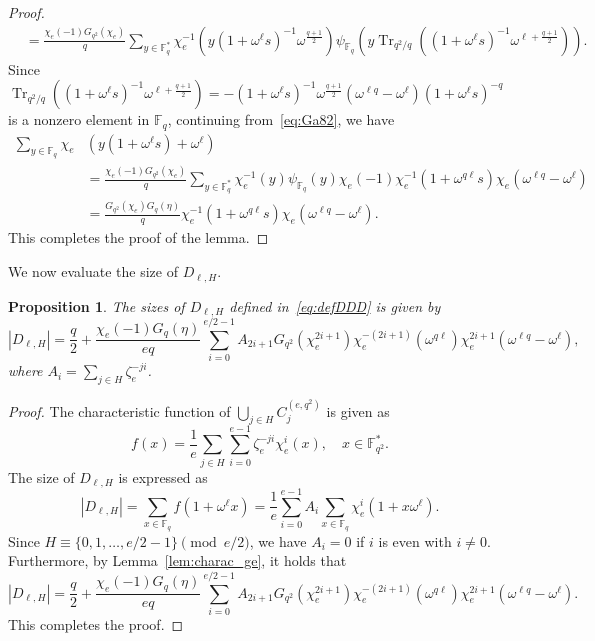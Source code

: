 \documentclass[10pt]{amsart}
\newtheorem{prop}[theo]{Proposition}
\theoremstyle{definition}
\DeclareMathOperator{\Tr}{Tr}
\newcommand*\F{{\mathbb F}}
\begin{document}
\begin{proof}
\begin{align}
&=\frac{\chi_e(-1)G_{q^2}(\chi_e)}{q}\sum_{y\in \F_q^\ast}\chi_e^{-1}(y (1+\omega^\ell s)^{-1}\omega^\frac{q+1}{2})\psi_{\F_q}(y\Tr_{q^2/q}((1+\omega^\ell s)^{-1}\omega^{\ell+\frac{q+1}{2}})). \label{eq:Ga82}
\end{align}
Since $\Tr_{q^2/q}((1+\omega^\ell s)^{-1}\omega^{\ell+\frac{q+1}{2}})=-(1+\omega^\ell s)^{-1}\omega^\frac{q+1}{2}(\omega^{\ell q}-\omega^\ell)(1+\omega^\ell s)^{-q}$ is a nonzero element in $\F_q$, continuing from~\eqref{eq:Ga82}, we have
\begin{align*}
\sum_{y\in \F_q}\chi_e&(y(1+\omega^\ell s)+\omega^\ell)\\
&=\frac{\chi_e(-1)G_{q^2}(\chi_e)}{q}\sum_{y\in \F_q^\ast}\chi_e^{-1}(y)\psi_{\F_q}(y)\chi_e(-1)\chi_e^{-1}(1+\omega^{q\ell}s)
\chi_e(\omega^{\ell q}-\omega^\ell)\\
&=\frac{G_{q^2}(\chi_e)G_q(\eta)}{q}\chi_e^{-1}(1+\omega^{q\ell}s)
\chi_e(\omega^{\ell q}-\omega^\ell).
\end{align*}
This completes the proof of the lemma.
\end{proof}

We now evaluate the size of $D_{\ell,H}$.

\begin{prop}\label{prop:sizeHH}
The sizes of $D_{\ell,H}$ defined in~\eqref{eq:defDDD} is given by
\begin{equation}\label{eq:sizeH}
|D_{\ell,H}|=\frac{q}{2}+\frac{\chi_e(-1)G_q(\eta)}{eq}\sum_{i=0}^{e/2-1} A_{2i+1} G_{q^2}(\chi_e^{2i+1})\chi_e^{-(2i+1)}(\omega^{q\ell})\chi_e^{2i+1}(\omega^{\ell q}-\omega^{\ell}),
\end{equation}
where $A_i=\sum_{j\in H}\zeta_e^{-ji}$.
\end{prop}

\begin{proof}
The characteristic function of $\bigcup_{j \in H}C_{j}^{(e,q^2)}$ is given as
\begin{equation}\label{eq:deff}
f(x)=\frac{1}{e}\sum_{j\in H}\sum_{i=0}^{e-1}\zeta_e^{-ji}\chi_e^i(x), \quad x\in \F_{q^2}^\ast.
\end{equation}
The size of $D_{\ell,H}$ is expressed as
\[
|D_{\ell,H}|=\sum_{x\in \F_q}f(1+\omega^\ell x)=\frac{1}{e}\sum_{i=0}^{e-1} A_i\sum_{x\in \F_q}\chi_e^i(1+x\omega^\ell).
\]
Since $H\equiv \{0,1,\ldots,e/2-1\}\pmod{e/2}$, we have $A_i=0$ if $i$ is even with $i\not=0$. Furthermore, by Lemma~\ref{lem:charac_ge}, it holds that
\[
|D_{\ell,H}|=\frac{q}{2}+\frac{\chi_e(-1)G_q(\eta)}{eq}\sum_{i=0}^{e/2-1} A_{2i+1} G_{q^2}(\chi_e^{2i+1})\chi_e^{-(2i+1)}(\omega^{q\ell})\chi_e^{2i+1}(\omega^{\ell q}-\omega^{\ell}).
\]
This completes the proof.
\end{proof}
\end{document}
